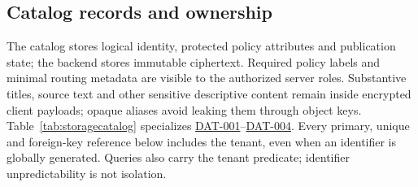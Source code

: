 \documentclass[11pt,a4paper]{article}
\newcommand{\rr}[1]{\hyperlink{req:#1}{#1}}
\begin{document}
\subsection{Catalog records and ownership}
The catalog stores logical identity, protected policy attributes and publication state; the backend stores immutable ciphertext. Required policy labels and minimal routing metadata are visible to the authorized server roles. Substantive titles, source text and other sensitive descriptive content remain inside encrypted client payloads; opaque aliases avoid leaking them through object keys. Table~\ref{tab:storagecatalog} specializes \rr{DAT-001}--\rr{DAT-004}. Every primary, unique and foreign-key reference below includes the tenant, even when an identifier is globally generated. Queries also carry the tenant predicate; identifier unpredictability is not isolation.
\end{document}
